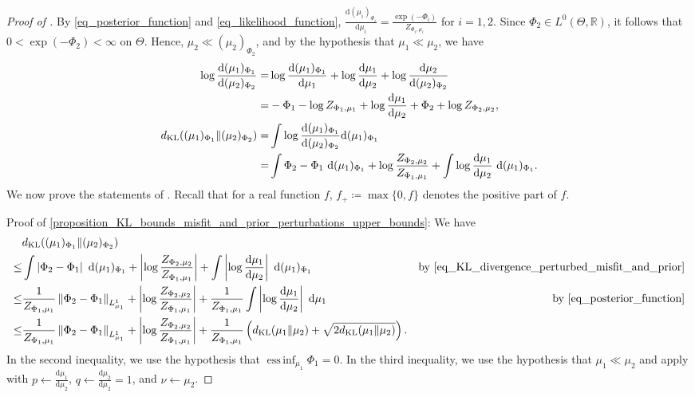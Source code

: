 \documentclass[a4paper]{scrartcl}
\theoremstyle{definition}
\numberwithin{equation}{section}
\newcommand{\R}{\mathbb{R}}
\newcommand{\rd}{\mathrm{d}}
\DeclareMathOperator*{\essinf}{ess\,inf}
\newcommand{\Abs}[1]{\left\vert#1\right\vert}
\newcommand{\Norm}[1]{\left\Vert #1 \right\Vert}
\newcommand{\KL}[0]{\textup{KL}}
\begin{document}
\KLboundsJointperturbations*
\begin{proof}[Proof of ]
By \eqref{eq_posterior_function} and \eqref{eq_likelihood_function}, $\tfrac{\rd (\mu_i)_{\Phi_i}}{\rd \mu_i}=\tfrac{\exp(-\Phi_i)}{Z_{\Phi_i,\mu_i}}$ for $i=1,2$.
Since $\Phi_2 \in L^0(\Theta,\R)$, it follows that $0<\exp(-\Phi_2)<\infty$ on $\Theta$.
Hence, $\mu_2\ll (\mu_2)_{\Phi_2}$, and by the hypothesis that $\mu_1\ll\mu_2$, we have
\begin{subequations}
 \begin{align}
 \log \frac{\rd (\mu_1)_{\Phi_1}}{\rd (\mu_2)_{\Phi_2}}=&\log \frac{\rd (\mu_1)_{\Phi_1}}{\rd\mu_1}+\log\frac{\rd\mu_1}{\rd\mu_2}+\log \frac{\rd\mu_2}{\rd (\mu_2)_{\Phi_2}}
 \nonumber
 \\
 =&-\Phi_1-\log Z_{\Phi_1,\mu_1}+\log\frac{\rd\mu_1}{\rd\mu_2}+\Phi_2+\log Z_{\Phi_2,\mu_2},
 \label{eq_log_RadonNikodymDerivative}
 \\
 d_{\KL}((\mu_1)_{\Phi_1}\Vert (\mu_2)_{\Phi_2})=&\int \log \frac{\rd (\mu_1)_{\Phi_1}}{\rd (\mu_2)_{\Phi_2}} \rd (\mu_1)_{\Phi_1}
 \nonumber
 \\
 =&\int \Phi_2-\Phi_1 ~\rd (\mu_1)_{\Phi_1}+\log \frac{Z_{\Phi_2,\mu_2}}{Z_{\Phi_1,\mu_1}}+ \int \log\frac{\rd\mu_1}{\rd\mu_2}~\rd (\mu_1)_{\Phi_1}.
 \label{eq_KL_divergence_perturbed_misfit_and_prior}
\end{align}
\end{subequations}
We now prove the statements of .
Recall that for a real function $f$, $f_+\coloneqq \max\{0,f\}$ denotes the positive part of $f$.

Proof of \cref{proposition_KL_bounds_misfit_and_prior_perturbations_upper_bounds}:
We have 
\begin{align*}
 &d_{\KL}((\mu_1)_{\Phi_1}\Vert (\mu_2)_{\Phi_2})
\\
\leq & \int \Abs{\Phi_2-\Phi_1 }~\rd (\mu_1)_{\Phi_1}+\Abs{\log \frac{Z_{\Phi_2,\mu_2}}{Z_{\Phi_1,\mu_1}}}+ \int \Abs{\log\frac{\rd\mu_1}{\rd\mu_2}} ~\rd (\mu_1)_{\Phi_1} & \text{by \eqref{eq_KL_divergence_perturbed_misfit_and_prior}}
\\
\leq & \frac{1}{Z_{\Phi_1,\mu_1}} \Norm{\Phi_2-\Phi_1}_{L^1_{\mu_1}} + \Abs{\log \frac{Z_{\Phi_2,\mu_2}}{Z_{\Phi_1,\mu_1}}}+\frac{1}{Z_{\Phi_1,\mu_1}} \int \Abs{\log\frac{\rd\mu_1}{\rd\mu_2}} ~\rd \mu_1 & \text{by \eqref{eq_posterior_function}}
\\
\leq & \frac{1}{Z_{\Phi_1,\mu_1}} \Norm{\Phi_2-\Phi_1}_{L^1_{\mu_1}} + \Abs{\log \frac{Z_{\Phi_2,\mu_2}}{Z_{\Phi_1,\mu_1}}}+\frac{1}{Z_{\Phi_1,\mu_1}} \left( d_{\KL}(\mu_1\Vert \mu_2)+\sqrt{2d_{\KL}(\mu_1\Vert \mu_2)}\right) .
\end{align*}
In the second inequality, we use the hypothesis that $\essinf_{\mu_1}\Phi_1=0$.
In the third inequality, we use the hypothesis that $\mu_1\ll\mu_2$ and apply  with $p\leftarrow \tfrac{\rd\mu_1}{\rd\mu_2}$, $q\leftarrow \tfrac{\rd\mu_2}{\rd\mu_2}=1$, and $\nu\leftarrow \mu_2$.


\end{proof}
\end{document}
